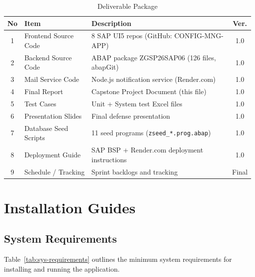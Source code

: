 \documentclass[12pt,a4paper]{report}
\begin{document}
\begin{table}[H]
\centering\small
\begin{tabularx}{\textwidth}{|c|l|X|c|}
  \hline
  \rowcolor{tableheadpeach}
  \textbf{No} & \textbf{Item} & \textbf{Description} & \textbf{Ver.} \\ \hline
  1 & Frontend Source Code  & 8 SAP UI5 repos (GitHub: CONFIG-MNG-APP)         & 1.0 \\ \hline
  2 & Backend Source Code   & ABAP package ZGSP26SAP06 (126 files, abapGit)    & 1.0 \\ \hline
  3 & Mail Service Code     & Node.js notification service (Render.com)        & 1.0 \\ \hline
  4 & Final Report          & Capstone Project Document (this file)            & 1.0 \\ \hline
  5 & Test Cases            & Unit + System test Excel files                   & 1.0 \\ \hline
  6 & Presentation Slides   & Final defense presentation                       & 1.0 \\ \hline
  7 & Database Seed Scripts & 11 seed programs (\texttt{zseed\_*.prog.abap})   & 1.0 \\ \hline
  8 & Deployment Guide      & SAP BSP + Render.com deployment instructions     & 1.0 \\ \hline
  9 & Schedule / Tracking   & Sprint backlogs and tracking                     & Final \\ \hline
\end{tabularx}
\caption{Deliverable Package}
\label{tab:deliverable-package}
\end{table}


\section{Installation Guides}

\subsection{System Requirements}

Table~\ref{tab:sys-requirements} outlines the minimum system requirements for installing and running the application.
\end{document}
